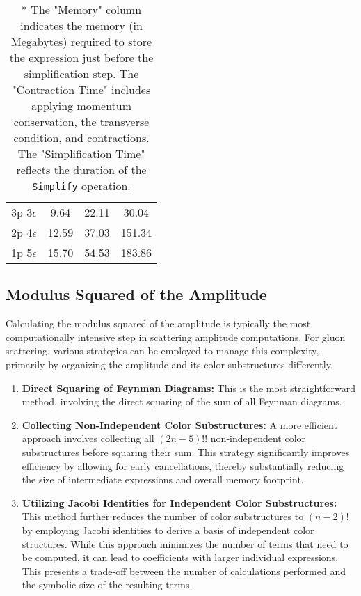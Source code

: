 \documentclass[main.tex]{subfiles}
\begin{document}
\begin{table}[htbp]
\begin{tabular}{|c|c|c|c|}
        3p 3$\epsilon$ & 9.64 & 22.11 & 30.04 \\
        2p 4$\epsilon$ & 12.59 & 37.03 & 151.34 \\
        1p 5$\epsilon$ & 15.70 & 54.53 & 183.86 \\
        \hline
    \end{tabular}
    \caption*{* The "Memory" column indicates the memory (in Megabytes) required to store the expression just before the simplification step. 
    The "Contraction Time" includes applying momentum conservation, the transverse condition, and contractions. The "Simplification Time" reflects the duration of the \texttt{Simplify} operation.}
\end{table}

\subsection{Modulus Squared of the Amplitude}

Calculating the modulus squared of the amplitude is typically the most computationally intensive step in scattering amplitude computations. 
For gluon scattering, various strategies can be employed to manage this complexity, primarily by organizing the amplitude and its color 
substructures differently.

\begin{enumerate}
    \item \textbf{Direct Squaring of Feynman Diagrams:} This is the most straightforward method, involving the direct squaring of the sum of all Feynman diagrams.

    \item \textbf{Collecting Non-Independent Color Substructures:} A more efficient approach involves collecting all $(2n-5)!!$ non-independent color substructures before squaring their sum. 
    This strategy significantly improves efficiency by allowing for early cancellations, thereby substantially reducing the size of intermediate expressions and overall memory footprint.

    \item \textbf{Utilizing Jacobi Identities for Independent Color Substructures:} This method further reduces the number of color substructures to $(n-2)!$ by employing Jacobi identities to derive a basis of independent color structures. 
    While this approach minimizes the number of terms that need to be computed, it can lead to coefficients with larger individual expressions. This presents a trade-off between the number of calculations performed and the symbolic size of the resulting terms.
\end{enumerate}
\end{document}
